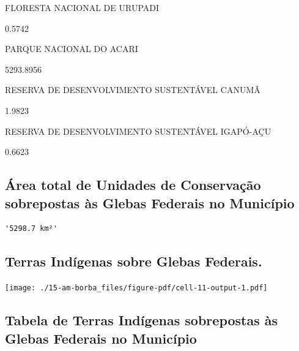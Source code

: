 \documentclass[
  letterpaper,
]{report}
\begin{document}
\n      

FLORESTA NACIONAL DE URUPADI

\n      

0.5742

\n    

\n    

\n      

PARQUE NACIONAL DO ACARI

\n      

5293.8956

\n    

\n    

\n      

RESERVA DE DESENVOLVIMENTO SUSTENTÁVEL CANUMÃ

\n      

1.9823

\n    

\n    

\n      

RESERVA DE DESENVOLVIMENTO SUSTENTÁVEL IGAPÓ-AÇU

\n      

0.6623

\n    

\n  

\n

\hypertarget{uxe1rea-total-de-unidades-de-conservauxe7uxe3o-sobrepostas-uxe0s-glebas-federais-no-municuxedpio-1}{%
\subsection{Área total de Unidades de Conservação sobrepostas às Glebas
Federais no
Município}\label{uxe1rea-total-de-unidades-de-conservauxe7uxe3o-sobrepostas-uxe0s-glebas-federais-no-municuxedpio-1}}

\begin{verbatim}
'5298.7 km²'
\end{verbatim}

\hypertarget{terras-induxedgenas-sobre-glebas-federais.-1}{%
\subsection{Terras Indígenas sobre Glebas
Federais.}\label{terras-induxedgenas-sobre-glebas-federais.-1}}

\texttt{[image: ./15-am-borba\_files/figure-pdf/cell-11-output-1.pdf]}

\hypertarget{tabela-de-terras-induxedgenas-sobrepostas-uxe0s-glebas-federais-no-municuxedpio-1}{%
\subsection{Tabela de Terras Indígenas sobrepostas às Glebas Federais no
Município}\label{tabela-de-terras-induxedgenas-sobrepostas-uxe0s-glebas-federais-no-municuxedpio-1}}
\end{document}
